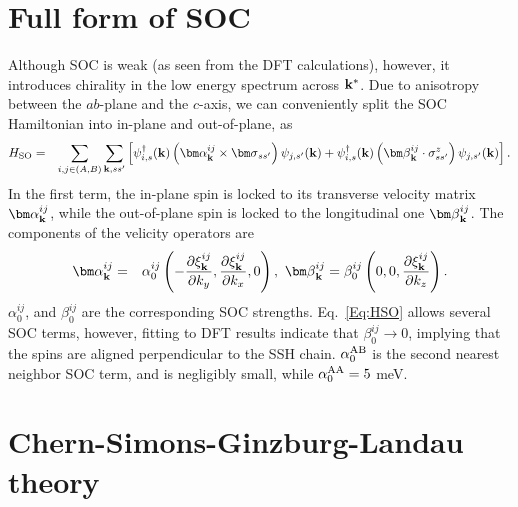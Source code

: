 \documentclass[aps,floatfix,prl]{revtex4}
\begin{document}
{
\section{Full form of SOC}
Although SOC is weak (as seen from the DFT calculations), however, it introduces chirality in the low energy spectrum across ${\bf k}^*$. Due to anisotropy between the $ab$-plane and the $c$-axis, we can conveniently split the SOC Hamiltonian into in-plane and out-of-plane, as 
%
\begin{eqnarray}
H_{\rm SO}&=&\sum_{i,j\in (A,B)}\sum_{{\bf k},ss'}\left[\psi^{\dag}_{i,s}({\bf k})\left({\bm \alpha}^{ij}_{\bf k}\times {\bm \sigma}_{ss'}\right)\psi_{j,s'}({\bf k}) + \psi^{\dag}_{i,s}({\bf k})\left({\bm \beta}^{ij}_{\bf k}\cdot\sigma^z_{ss'}\right)\psi_{j,s'}({\bf k})\right].
\label{Eq:HSO}
\end{eqnarray}
In the first term, the in-plane spin is locked to its transverse velocity matrix ${\bm \alpha}^{ij}_{\bf k}$, while the out-of-plane spin is locked to the longitudinal one ${\bm \beta}^{ij}_{\bf k}$. The components of the velicity operators are
%
\begin{eqnarray}
{\bm \alpha}^{ij}_{\bf k}& = &\alpha^{ij}_0\left(-\frac{\partial \xi^{ij}_{\bf k}}{\partial k_y},\frac{\partial \xi^{ij}_{\bf k}}{\partial  k_x},0\right), ~{\bm \beta}^{ij}_{\bf k}=\beta^{ij}_0\left(0,0,\frac{\partial \xi^{ij}_{\bf k}}{\partial k_z}\right). 
\label{Eq:SOC}
\end{eqnarray}
%
$\alpha^{ij}_0$, and $\beta^{ij}_0$ are the corresponding SOC strengths. Eq.~\ref{Eq:HSO} allows several SOC terms, however, fitting to DFT results indicate that $\beta^{ij}_0\rightarrow 0$, implying that the spins are aligned perpendicular to the SSH chain. $\alpha^{\rm AB}_0$ is the second nearest neighbor SOC term, and is negligibly small, while $\alpha^{\rm AA}_0=5$ meV.

}
\section{Chern-Simons-Ginzburg-Landau theory}
\end{document}
